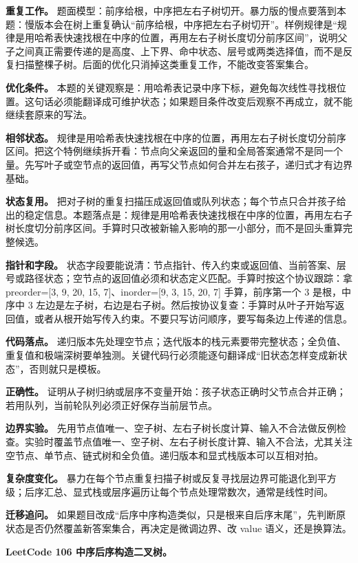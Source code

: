 \textbf{重复工作。} 题面模型：前序给根，中序把左右子树切开。暴力版的慢点要落到本题：慢版本会在树上重复确认“前序给根，中序把左右子树切开”。样例规律是“规律是用哈希表快速找根在中序的位置，再用左右子树长度切分前序区间”，说明父子之间真正需要传递的是高度、上下界、命中状态、层号或两类选择值，而不是反复扫描整棵子树。后面的优化只消掉这类重复工作，不能改变答案集合。

\textbf{优化条件。} 本题的关键观察是：用哈希表记录中序下标，避免每次线性寻找根位置。这句话必须能翻译成可维护状态；如果题目条件改变后观察不再成立，就不能继续套原来的写法。

\textbf{相邻状态。} 规律是用哈希表快速找根在中序的位置，再用左右子树长度切分前序区间。把这个特例继续拆开看：节点向父亲返回的量和全局答案通常不是同一个量。先写叶子或空节点的返回值，再写父节点如何合并左右孩子，递归式才有边界基础。

\textbf{状态复用。} 把对子树的重复扫描压成返回值或队列状态；每个节点只合并孩子给出的稳定信息。本题落点是：规律是用哈希表快速找根在中序的位置，再用左右子树长度切分前序区间。手算时只改被新输入影响的那一小部分，而不是回头重算完整候选。

\textbf{指针和字段。} 状态字段要能说清：节点指针、传入约束或返回值、当前答案、层号或路径状态；空节点的返回值必须和状态定义匹配。手算时按这个协议跟踪：拿 preorder=[3, 9, 20, 15, 7]、inorder=[9, 3, 15, 20, 7] 手算，前序第一个 3 是根，中序中 3 左边是左子树，右边是右子树。然后按协议复查：手算时从叶子开始写返回值，或者从根开始写传入约束。不要只写访问顺序，要写每条边上传递的信息。

\textbf{代码落点。} 递归版本先处理空节点；迭代版本的栈元素要带完整状态；全负值、重复值和极端深树要单独测。关键代码行必须能逐句翻译成“旧状态怎样变成新状态”，否则就只是模板。

\textbf{正确性。} 证明从子树归纳或层序不变量开始：孩子状态正确时父节点合并正确；若用队列，当前轮队列必须正好保存当前层节点。

\textbf{边界实验。} 先用节点值唯一、空子树、左右子树长度计算、输入不合法做反例检查。实验时覆盖节点值唯一、空子树、左右子树长度计算、输入不合法，尤其关注空节点、单节点、链式树和全负值。递归版本和显式栈版本可以互相对拍。

\textbf{复杂度变化。} 暴力在每个节点重复扫描子树或反复寻找层边界可能退化到平方级；后序汇总、显式栈或层序遍历让每个节点处理常数次，通常是线性时间。

\textbf{迁移追问。} 如果题目改成“后序中序构造类似，只是根来自后序末尾”，先判断原状态是否仍然覆盖新答案集合，再决定是微调边界、改 value 语义，还是换算法。

\noindent\textbf{LeetCode 106 中序后序构造二叉树。}

